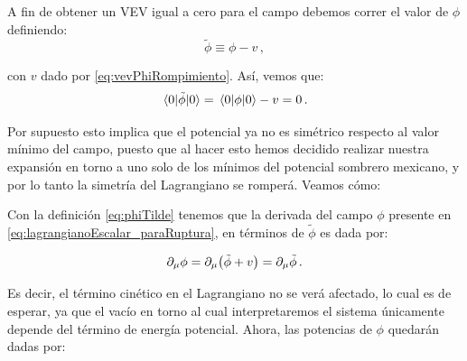 A fin de obtener un VEV igual a cero para el campo debemos correr el valor de $\phi$ definiendo:
%
\begin{equation}
  \label{eq:phiTilde}
    \tilde{\phi} \equiv \phi - v \,,
\end{equation}

\noindent con $v$ dado por \eqref{eq:vevPhiRompimiento}. Así, vemos que:
%
\begin{equation}
    \mel{0}{\tilde{\phi}}{0} = \mel{0}{\phi}{0} - v = 0\,.
\end{equation}

Por supuesto esto implica que el potencial ya no es simétrico respecto al valor mínimo del campo, puesto que al hacer esto hemos decidido realizar nuestra expansión en torno a uno solo de los mínimos del potencial sombrero mexicano, y por lo tanto la simetría del Lagrangiano se romperá. Veamos cómo:

Con la definición \eqref{eq:phiTilde} tenemos que la derivada del campo $\phi$ presente en \eqref{eq:lagrangianoEscalar_paraRuptura}, en términos de $\tilde{\phi}$ es dada por:

\begin{equation*}
    \partial_\mu \phi = \partial_\mu \qty(\tilde{\phi} + v) = \partial_\mu \tilde{\phi} \,.
\end{equation*}

Es decir, el término cinético en el Lagrangiano no se verá afectado, lo cual es de esperar, ya que el vacío en torno al cual interpretaremos el sistema únicamente depende del término de energía potencial. Ahora, las potencias de $\phi$ quedarán dadas por:
%

